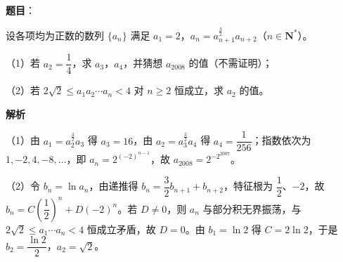 \begin{answer}

\textbf{题目}：

设各项均为正数的数列 $\{a_n\}$ 满足 $a_1=2$，$a_n=a_{n+1}^{\frac32}a_{n+2}$（$n\in\mathbf N^*$）。

（1）若 $a_2=\dfrac14$，求 $a_3$，$a_4$，并猜想 $a_{2008}$ 的值（不需证明）；

（2）若 $2\sqrt2\leqslant a_1a_2\cdots a_n<4$ 对 $n\geqslant2$ 恒成立，求 $a_2$ 的值。

\textbf{解析}

（1）由 $a_1=a_2^{\frac32}a_3$ 得 $a_3=16$，由 $a_2=a_3^{\frac32}a_4$ 得 $a_4=\dfrac1{256}$；指数依次为 $1,-2,4,-8,\dots$，即 $a_n=2^{(-2)^{n-1}}$，故 $a_{2008}=2^{-2^{2007}}$。

（2）令 $b_n=\ln a_n$，由递推得 $b_n=\dfrac32b_{n+1}+b_{n+2}$，特征根为 $\dfrac12$、$-2$，故 $b_n=C\left(\dfrac12\right)^n+D(-2)^n$。若 $D\neq0$，则 $a_n$ 与部分积无界振荡，与 $2\sqrt2\leqslant a_1\cdots a_n<4$ 恒成立矛盾，故 $D=0$。由 $b_1=\ln2$ 得 $C=2\ln2$，于是 $b_2=\dfrac{\ln2}2$，$a_2=\sqrt2$。


\end{answer}